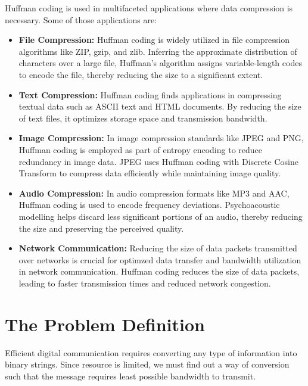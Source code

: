 \documentclass[18pt]{article}
\begin{document}
	Huffman coding is used in multifaceted applications where data compression is necessary. Some of those applications are: 
	
	\begin{itemize}
		\item \textbf{File Compression:} Huffman coding is widely utilized in file compression algorithms like ZIP, gzip, and zlib. Inferring the approximate distribution of characters over a large file, Huffman's algorithm assigns variable-length codes to encode the file, thereby reducing the size to a significant extent. 
		
		\item \textbf{Text Compression:}  Huffman coding finds applications in compressing textual data such as ASCII text and HTML documents. By reducing the size of text files, it optimizes storage space and transmission bandwidth. 
		
		\item \textbf{Image Compression:} In image compression standards like JPEG and PNG, Huffman coding is employed as part of entropy encoding to reduce redundancy in image data. 
		JPEG uses Huffman coding with Discrete Cosine Transform to compress data efficiently while maintaining image quality.
		
		\item \textbf{Audio Compression:} In audio compression formats like MP3 and AAC, Huffman coding is used to encode frequency deviations. Psychoacoustic modelling helps discard less significant portions of an audio, thereby reducing the size and preserving the perceived quality.
		
		
		\item \textbf{Network Communication:} Reducing the size of data packets transmitted over networks is crucial for optimzed data transfer and bandwidth utilization in network communication. Huffman coding reduces the size of data packets, leading to faster transmission times and reduced network congestion.
		
		
	\end{itemize}
	
	\newpage
	
	\section{The Problem Definition}
	
	Efficient digital communication requires converting any type of
	information into binary strings. Since resource is limited, we must find
	out a way of conversion such that the message requires least possible
	bandwidth to transmit.
	
\end{document}
